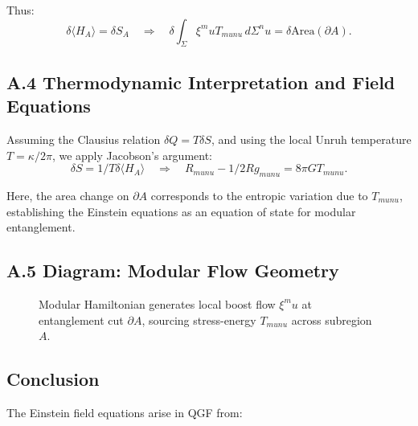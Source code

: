 \documentclass[11pt]{article}
\def\mu{mu}
\def\nu{nu}
\def\frac#1#2{#1/#2}
\begin{document}
Thus:
\[
\delta \langle H_A \rangle = \delta S_A \quad \Rightarrow \quad \delta \int_\Sigma \xi^\mu T_{\mu\nu} \, d\Sigma^\nu = \delta \text{Area}(\partial A).
\]

\subsection*{A.4 Thermodynamic Interpretation and Field Equations}

Assuming the Clausius relation \( \delta Q = T \delta S \), and using the local Unruh temperature \( T = \kappa / 2\pi \), we apply Jacobson’s argument:
\[
\delta S = \frac{1}{T} \delta \langle H_A \rangle \quad \Rightarrow \quad R_{\mu\nu} - \frac{1}{2} R g_{\mu\nu} = 8\pi G T_{\mu\nu}.
\]

Here, the area change on \( \partial A \) corresponds to the entropic variation due to \( T_{\mu\nu} \), establishing the Einstein equations as an equation of state for modular entanglement.

\subsection*{A.5 Diagram: Modular Flow Geometry}

\begin{figure}[H]
\centering
{}
\caption{Modular Hamiltonian generates local boost flow \( \xi^\mu \) at entanglement cut \( \partial A \), sourcing stress-energy \( T_{\mu\nu} \) across subregion \( A \).}
\label{fig:modular-flow-boost}
\end{figure}

\subsection*{Conclusion}

The Einstein field equations arise in QGF from:
\end{document}
